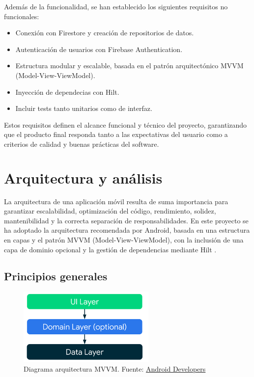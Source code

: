 Además de la funcionalidad, se han establecido los siguientes requisitos no funcionales:

\begin{itemize}
    \item Conexión con Firestore y creación de repositorios de datos.
    \item Autenticación de usuarios con Firebase Authentication.
    \item Estructura modular y escalable, basada en el patrón arquitectónico MVVM (Model-View-ViewModel).
    \item Inyección de dependecias con Hilt.
    \item Incluir tests tanto unitarios como de interfaz.
\end{itemize}

Estos requisitos definen el alcance funcional y técnico del proyecto, garantizando que el producto final responda tanto a las expectativas del usuario como a criterios de calidad y buenas prácticas del software.

\section{Arquitectura y análisis}
\label{sec:arquitectura-analisis}

La arquitectura de una aplicación móvil resulta de suma importancia para garantizar escalabilidad, optimización del código, rendimiento, solidez, mantenibilidad y la correcta separación de responsabilidades. En este proyecto se ha adoptado la arquitectura recomendada por Android, basada en una estructura en capas y el patrón MVVM (Model-View-ViewModel), con la inclusión de una capa de dominio opcional y la gestión de dependencias mediante Hilt \cite{android-architecture} \cite{mvvm}.

\subsection{Principios generales}

\begin{figure}[H]
\centering
\includegraphics[width=0.6\textwidth]{./img/description/mvvm.png}
\caption{Diagrama arquitectura MVVM. Fuente: \href{https://developer.android.com/topic/architecture?hl=es-419}{Android Developers}}
\label{fig:mvvm}
\end{figure}

